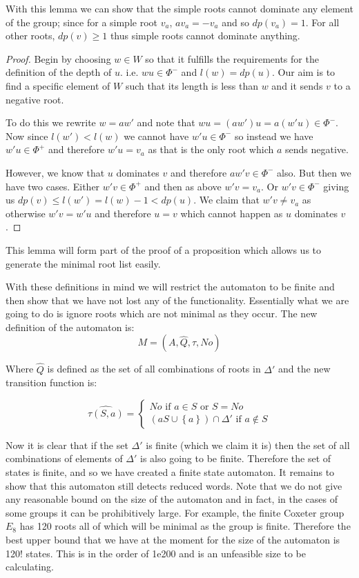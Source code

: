 \documentclass[a4paper,12pt]{article}
\begin{document}
With this lemma we can show that the simple roots cannot dominate any element of the group; since for a simple root $v_a$, $av_a = -v_a$ and so $dp(v_a) = 1$. For all other roots, $dp(v) \geq 1$ thus simple roots cannot dominate anything.

\begin{proof}
	Begin by choosing $w \in W$ so that it fulfills the requirements for the definition of the depth of $u$. i.e. $wu \in \Phi^-$ and $l(w) = dp(u)$. Our aim is to find a specific element of $W$ such that its length is less than $w$ and it sends $v$ to a negative root.
	
	To do this we rewrite $w = aw'$ and note that $wu = (aw')u = a(w'u) \in \Phi^-$. Now since $l(w') < l(w)$ we cannot have $w'u \in \Phi^-$ so instead we have $w'u \in \Phi^+$ and therefore $w'u = v_a$ as that is the only root which $a$ sends negative. 
	
	However, we know that $u$ dominates $v$ and therefore $aw'v \in \Phi^-$ also. But then we have two cases. Either $w'v \in \Phi^+$ and then as above $w'v = v_a$. Or $w'v \in \Phi^-$ giving us $dp(v) \leq l(w') = l(w) - 1 < dp(u)$. We claim that $w'v \neq v_a$ as otherwise $w'v = w'u$ and therefore $u = v$ which cannot happen as $u$ dominates $v$.
\end{proof}

This lemma will form part of the proof of a proposition which allows us to generate the minimal root list easily.

With these definitions in mind we will restrict the automaton to be finite and then show that we have not lost any of the functionality. Essentially what we are going to do is ignore roots which are not minimal as they occur. The new definition of the automaton is:
\[M = (A, \hat{Q}, \hat{\tau}, No)\]

Where $\hat{Q}$ is defined as the set of all combinations of roots in $\Delta'$ and the new transition function is:

\begin{equation*}
	\hat{\tau(S, a)} = 
	\begin{cases}
		No \text{ if } a \in S \text{ or } S = No \\
		(aS \cup \left\{a\right\}) \cap \Delta' \text{ if } a \notin S
	\end{cases}
\end{equation*}

Now it is clear that if the set $\Delta'$ is finite (which we claim it is) then the set of all combinations of elements of $\Delta'$ is also going to be finite. Therefore the set of states is finite, and so we have created a finite state automaton. It remains to show that this automaton still detects reduced words. Note that we do not give any reasonable bound on the size of the automaton and in fact, in the cases of some groups it can be prohibitively large. For example, the finite Coxeter group $E_8$ has 120 roots all of which will be minimal as the group is finite. Therefore the best upper bound that we have at the moment for the size of the automaton is 120! states. This is in the order of 1e200 and is an unfeasible size to be calculating. 
\end{document}
